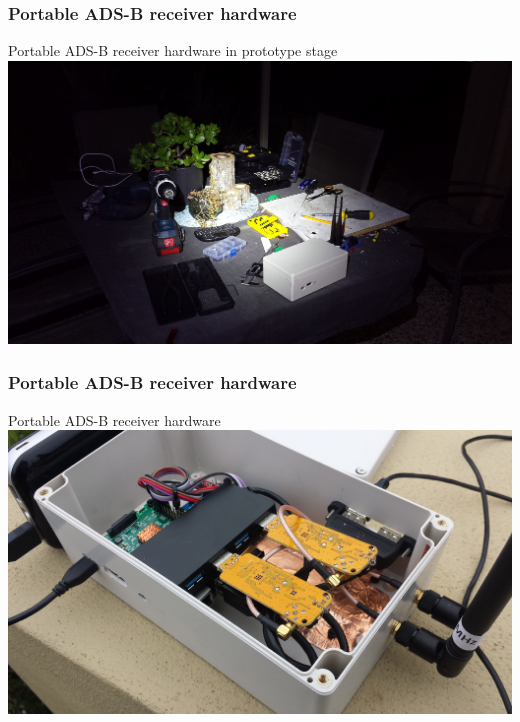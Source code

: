 \begin{frame}
\frametitle{Portable ADS-B receiver hardware}
\begin{block}{Portable ADS-B receiver hardware in prototype stage}
\includegraphics[height=0.5\textheight]{image/adsb-hardware-prototype2.png}
\end{block}
\end{frame}

\begin{frame}
\frametitle{Portable ADS-B receiver hardware}
\begin{block}{Portable ADS-B receiver hardware}
\includegraphics[height=0.5\textheight]{image/adsb-hardware.png}
\end{block}
\end{frame}

